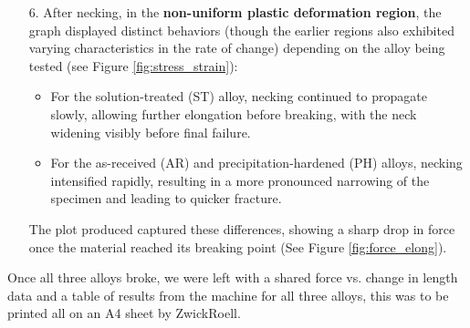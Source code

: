 \documentclass{article}
\begin{document}
\newpage
\begin{enumerate}
    \item[6.] After necking, in the \textbf{non-uniform plastic deformation region}, the graph displayed distinct behaviors (though the earlier regions also exhibited varying characteristics in the rate of change) depending on the alloy being tested (see Figure \ref{fig:stress_strain}):
    \begin{itemize}
        \item For the solution-treated (ST) alloy, necking continued to propagate slowly, allowing further elongation before breaking, with the neck widening visibly before final failure.
        \item For the as-received (AR) and precipitation-hardened (PH) alloys, necking intensified rapidly, resulting in a more pronounced narrowing of the specimen and leading to quicker fracture.
    \end{itemize}
    The plot produced captured these differences, showing a sharp drop in force once the material reached its breaking point (See Figure \ref{fig:force_elong}).
\end{enumerate}
Once all three alloys broke, we were left with a shared force vs. change in length data and a table of results from the machine for all three alloys, this was to be printed all on an A4 sheet by ZwickRoell.\\ 
\vspace{3em}
\end{document}
